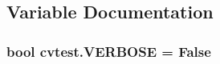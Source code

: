 \subsection{Variable Documentation}
\subsubsection[{\texorpdfstring{V\+E\+R\+B\+O\+SE}{VERBOSE}}]{\setlength{\rightskip}{0pt plus 5cm}bool cvtest.\+V\+E\+R\+B\+O\+SE = False}\hypertarget{namespacecvtest_a77dc49644bd9f436671cd8f839604a45}{}\label{namespacecvtest_a77dc49644bd9f436671cd8f839604a45}
